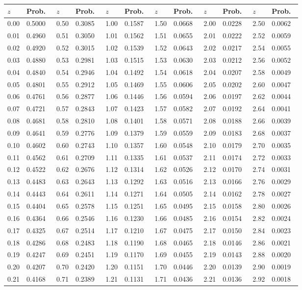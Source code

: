 \documentclass[11pt,a4paper,openany]{book}
\begin{document}
\begin{longtable}[]{@{}llllllllllll@{}}
\toprule
\(z\) & Prob.~ & \(z\) & Prob.~ & \(z\) & Prob.~ & \(z\) & Prob.~ &
\(z\) & Prob.~ & \(z\) & Prob.~\tabularnewline
\midrule
\endhead
0.00 & 0.5000 & 0.50 & 0.3085 & 1.00 & 0.1587 & 1.50 & 0.0668 & 2.00 &
0.0228 & 2.50 & 0.0062\tabularnewline
0.01 & 0.4960 & 0.51 & 0.3050 & 1.01 & 0.1562 & 1.51 & 0.0655 & 2.01 &
0.0222 & 2.52 & 0.0059\tabularnewline
0.02 & 0.4920 & 0.52 & 0.3015 & 1.02 & 0.1539 & 1.52 & 0.0643 & 2.02 &
0.0217 & 2.54 & 0.0055\tabularnewline
0.03 & 0.4880 & 0.53 & 0.2981 & 1.03 & 0.1515 & 1.53 & 0.0630 & 2.03 &
0.0212 & 2.56 & 0.0052\tabularnewline
0.04 & 0.4840 & 0.54 & 0.2946 & 1.04 & 0.1492 & 1.54 & 0.0618 & 2.04 &
0.0207 & 2.58 & 0.0049\tabularnewline
0.05 & 0.4801 & 0.55 & 0.2912 & 1.05 & 0.1469 & 1.55 & 0.0606 & 2.05 &
0.0202 & 2.60 & 0.0047\tabularnewline
0.06 & 0.4761 & 0.56 & 0.2877 & 1.06 & 0.1446 & 1.56 & 0.0594 & 2.06 &
0.0197 & 2.62 & 0.0044\tabularnewline
0.07 & 0.4721 & 0.57 & 0.2843 & 1.07 & 0.1423 & 1.57 & 0.0582 & 2.07 &
0.0192 & 2.64 & 0.0041\tabularnewline
0.08 & 0.4681 & 0.58 & 0.2810 & 1.08 & 0.1401 & 1.58 & 0.0571 & 2.08 &
0.0188 & 2.66 & 0.0039\tabularnewline
0.09 & 0.4641 & 0.59 & 0.2776 & 1.09 & 0.1379 & 1.59 & 0.0559 & 2.09 &
0.0183 & 2.68 & 0.0037\tabularnewline
0.10 & 0.4602 & 0.60 & 0.2743 & 1.10 & 0.1357 & 1.60 & 0.0548 & 2.10 &
0.0179 & 2.70 & 0.0035\tabularnewline
0.11 & 0.4562 & 0.61 & 0.2709 & 1.11 & 0.1335 & 1.61 & 0.0537 & 2.11 &
0.0174 & 2.72 & 0.0033\tabularnewline
0.12 & 0.4522 & 0.62 & 0.2676 & 1.12 & 0.1314 & 1.62 & 0.0526 & 2.12 &
0.0170 & 2.74 & 0.0031\tabularnewline
0.13 & 0.4483 & 0.63 & 0.2643 & 1.13 & 0.1292 & 1.63 & 0.0516 & 2.13 &
0.0166 & 2.76 & 0.0029\tabularnewline
0.14 & 0.4443 & 0.64 & 0.2611 & 1.14 & 0.1271 & 1.64 & 0.0505 & 2.14 &
0.0162 & 2.78 & 0.0027\tabularnewline
0.15 & 0.4404 & 0.65 & 0.2578 & 1.15 & 0.1251 & 1.65 & 0.0495 & 2.15 &
0.0158 & 2.80 & 0.0026\tabularnewline
0.16 & 0.4364 & 0.66 & 0.2546 & 1.16 & 0.1230 & 1.66 & 0.0485 & 2.16 &
0.0154 & 2.82 & 0.0024\tabularnewline
0.17 & 0.4325 & 0.67 & 0.2514 & 1.17 & 0.1210 & 1.67 & 0.0475 & 2.17 &
0.0150 & 2.84 & 0.0023\tabularnewline
0.18 & 0.4286 & 0.68 & 0.2483 & 1.18 & 0.1190 & 1.68 & 0.0465 & 2.18 &
0.0146 & 2.86 & 0.0021\tabularnewline
0.19 & 0.4247 & 0.69 & 0.2451 & 1.19 & 0.1170 & 1.69 & 0.0455 & 2.19 &
0.0143 & 2.88 & 0.0020\tabularnewline
0.20 & 0.4207 & 0.70 & 0.2420 & 1.20 & 0.1151 & 1.70 & 0.0446 & 2.20 &
0.0139 & 2.90 & 0.0019\tabularnewline
0.21 & 0.4168 & 0.71 & 0.2389 & 1.21 & 0.1131 & 1.71 & 0.0436 & 2.21 &
0.0136 & 2.92 & 0.0018\tabularnewline

\end{longtable}
\end{document}
